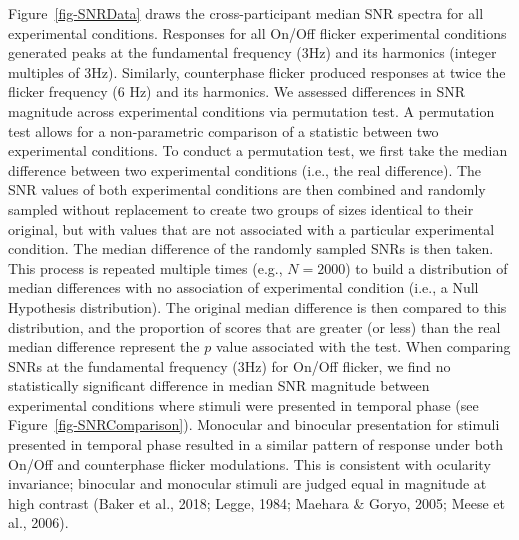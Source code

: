 \documentclass[
  12pt,
]{article}
\begin{document}
Figure~\ref{fig-SNRData} draws the cross-participant median SNR spectra
for all experimental conditions. Responses for all On/Off flicker
experimental conditions generated peaks at the fundamental frequency
(3Hz) and its harmonics (integer multiples of 3Hz). Similarly,
counterphase flicker produced responses at twice the flicker frequency
(6 Hz) and its harmonics. We assessed differences in SNR magnitude
across experimental conditions via permutation test. A permutation test
allows for a non-parametric comparison of a statistic between two
experimental conditions. To conduct a permutation test, we first take
the median difference between two experimental conditions (i.e., the
real difference). The SNR values of both experimental conditions are
then combined and randomly sampled without replacement to create two
groups of sizes identical to their original, but with values that are
not associated with a particular experimental condition. The median
difference of the randomly sampled SNRs is then taken. This process is
repeated multiple times (e.g., \(N = 2000\)) to build a distribution of
median differences with no association of experimental condition (i.e.,
a Null Hypothesis distribution). The original median difference is then
compared to this distribution, and the proportion of scores that are
greater (or less) than the real median difference represent the \(p\)
value associated with the test. When comparing SNRs at the fundamental
frequency (3Hz) for On/Off flicker, we find no statistically significant
difference in median SNR magnitude between experimental conditions where
stimuli were presented in temporal phase (see
Figure~\ref{fig-SNRComparison}). Monocular and binocular presentation
for stimuli presented in temporal phase resulted in a similar pattern of
response under both On/Off and counterphase flicker modulations. This is
consistent with ocularity invariance; binocular and monocular stimuli
are judged equal in magnitude at high contrast (Baker et al., 2018;
Legge, 1984; Maehara \& Goryo, 2005; Meese et al., 2006).
\end{document}
